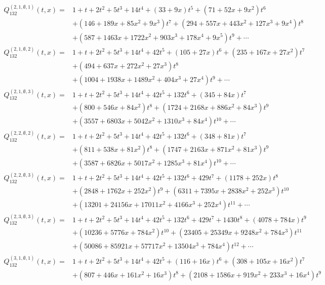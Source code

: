\documentclass[
final,nomarks
]{dmtcs-episciences}
\newcommand{\Qmm}[1]{Q_{132}^{(#1)}(t,x)}
\begin{document}
\begin{align}
\Qmm{2,1,\emptyset,1}=&1+t+2 t^2+5 t^3+14 t^4+(33+9 x) t^5+\left(71+52 x+9 x^2\right)
t^6\nonumber\\\nonumber
&+\left(146+189 x+85 x^2+9 x^3\right) t^7+\left(294+557 x+443 x^2+127
x^3+9 x^4\right) t^8\\
&+\left(587+1463 x+1722 x^2+903 x^3+178 x^4+9 x^5\right)
t^9+\cdots
\\
\Qmm{2,1,\emptyset,2}=&1+t+2 t^2+5 t^3+14 t^4+42 t^5+(105+27 x) t^6+\left(235+167 x+27 x^2\right)
t^7\nonumber\\\nonumber
&+\left(494+637 x+272 x^2+27 x^3\right) t^8\\
&+\left(1004+1938 x+1489 x^2+404
x^3+27 x^4\right) t^9+\cdots
\\
\Qmm{2,1,\emptyset,3}=&1+t+2 t^2+5 t^3+14 t^4+42 t^5+132 t^6+(345+84 x) t^7\nonumber\\\nonumber
&+\left(800+546 x+84
x^2\right) t^8+\left(1724+2168 x+886 x^2+84 x^3\right) t^9\\
&+\left(3557+6803
x+5042 x^2+1310 x^3+84 x^4\right) t^{10}+\cdots
\\
\Qmm{2,2,\emptyset,2}=&1+t+2 t^2+5 t^3+14 t^4+42 t^5+132 t^6+(348+81 x) t^7\nonumber\\\nonumber
&+\left(811+538 x+81
x^2\right) t^8+\left(1747+2163 x+871 x^2+81 x^3\right) t^9\\
&+\left(3587+6826
x+5017 x^2+1285 x^3+81 x^4\right) t^{10}+\cdots
\\
\Qmm{2,2,\emptyset,3}=&1+t+2 t^2+5 t^3+14 t^4+42 t^5+132 t^6+429 t^7+(1178+252 x) t^8\nonumber\\\nonumber
&+\left(2848+1762
x+252 x^2\right) t^9+\left(6311+7395 x+2838 x^2+252 x^3\right)
t^{10}\\
&+\left(13201+24156 x+17011 x^2+4166 x^3+252 x^4\right)
t^{11}+\cdots
\\
\Qmm{2,3,\emptyset,3}=&1+t+2 t^2+5 t^3+14 t^4+42 t^5+132 t^6+429 t^7+1430 t^8+(4078+784 x)
t^9\nonumber\\\nonumber
&+\left(10236+5776 x+784 x^2\right) t^{10}+\left(23405+25349 x+9248
x^2+784 x^3\right) t^{11}\\
&+\left(50086+85921 x+57717 x^2+13504 x^3+784
x^4\right) t^{12}+\cdots
\\
\Qmm{3,1,\emptyset,1}=&1+t+2 t^2+5 t^3+14 t^4+42 t^5+(116+16 x) t^6+\left(308+105 x+16 x^2\right)
t^7\nonumber\\\nonumber
&+\left(807+446 x+161 x^2+16 x^3\right) t^8+\left(2108+1586 x+919 x^2+233
x^3+16 x^4\right) t^9\\

\end{align}
\end{document}

